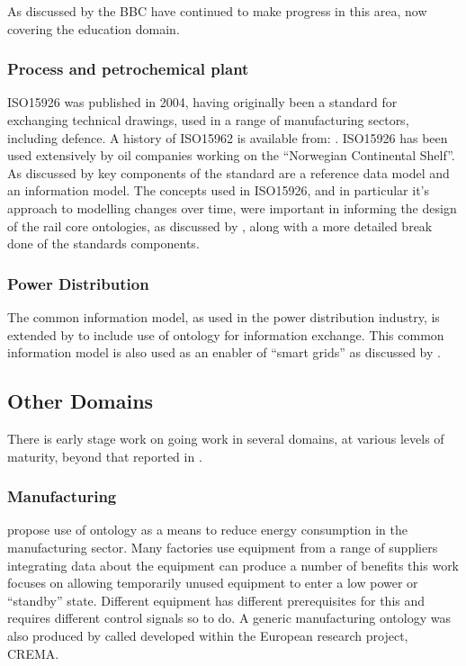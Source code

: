 As discussed by \citet{Mikroyannidi2016} the BBC have continued to make progress in this area, now covering the education domain.  
\subsubsection{Process and petrochemical plant}
 ISO15926 was published in 2004, having originally been a standard for exchanging technical drawings, used in a range of manufacturing sectors, including defence. A history of ISO15962 is available from: \citep{POSCCaesarAssociation2011}. ISO15926 has been used extensively by oil companies working on the ``Norwegian Continental Shelf''. As discussed by \citet{Leal2005} key components of the standard are a reference data model and an information model. The concepts used in ISO15926, and in particular it's approach to modelling changes over time, were important in informing the design of the rail core ontologies, as discussed by \citet{Tutcher2015}, along with a more detailed break done of the standards components. 
\subsubsection{Power Distribution}
The common information model, as used in the power distribution industry, is extended by \citet{Hargreaves2013} to include use of ontology for information exchange. This common information model is also used as an enabler of ``smart grids'' as discussed by \citet{Fremont}.

\subsection{Other Domains}
There is early stage work on going work in several domains, at various levels of maturity, beyond that reported in \citep{Morris2014}.

 \subsubsection{Manufacturing}
\citet{Mueller2015} propose use of ontology as a means to reduce energy consumption in the manufacturing sector. Many factories use equipment from a range of suppliers integrating data about the equipment can produce a number of benefits this work focuses on allowing temporarily unused equipment to enter a low power or ``standby'' state. Different equipment has different prerequisites for this and requires different control signals so to do. A generic manufacturing ontology was also produced by \citet{Mazzola2016} called  developed within the European research project, CREMA.
